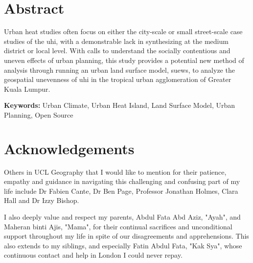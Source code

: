 

\section*{\normalfont\bfseries\LARGE{{Abstract}}} %


Urban heat studies often focus on either the city-scale or small street-scale case studies of the \Gls{uhi}, with a demonstrable lack in synthesizing at the medium district or local level. With calls to understand the socially contentious and uneven effects of urban planning, this study provides a potential new method of analysis through running an urban land surface model, \Gls{suews}, to analyze the geospatial unevenness of \Gls{uhi} in the tropical urban agglomeration of Greater Kuala Lumpur. 











\textbf{Keywords:} Urban Climate, Urban Heat Island, Land Surface Model, Urban Planning, Open Source



\clearpage
\thispagestyle{only_footer}
\section*{\normalfont\bfseries\LARGE{{Acknowledgements}}}


Others in UCL Geography that I would like to mention for their patience, empathy and guidance in navigating this challenging and confusing part of my life include Dr Fabien Cante, Dr Ben Page, Professor Jonathan Holmes, Clara Hall and Dr Izzy Bishop. 

\noindent I also deeply value and respect my parents, Abdul Fata Abd Aziz, "Ayah", and Maheran binti Ajis, "Mama", for their continual sacrifices and unconditional support throughout my life in spite of our disagreements and apprehensions. This also extends to my siblings, and especially Fatin Abdul Fata, "Kak Sya", whose continuous contact and help in London I could never repay. 

